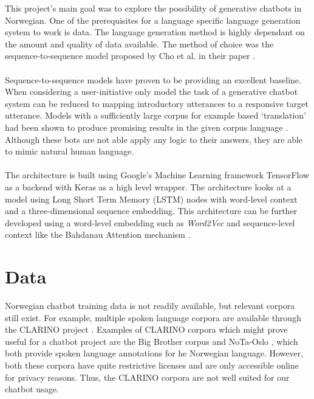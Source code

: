 \documentclass{article}
\begin{document}
This project's main goal was to explore the possibility of generative chatbots
in Norwegian. One of the prerequisites for a language specific language
generation system to work is data. The language generation method is highly
dependant on the amount and quality of data available. The method of choice was
the sequence-to-sequence model proposed by Cho et al. in their paper \cite{Cho2014}.

\paragraph{}
Sequence-to-sequence models have proven to be providing an excellent baseline.
When considering a user-initiative only model the task of a generative chatbot
system can be reduced to mapping introductory utterances to a responsive target
utterance.  Models with a sufficiently large corpus for example based
`translation' had been shown to produce promising results in the given corpus
language \cite{Ezquerra2018}. Although these bots are not able apply any logic
to their answers, they are able to mimic natural human language.

\paragraph{}
The architecture is built using Google's Machine Learning framework TensorFlow
as a backend with Keras as a high level wrapper. The architecture looks at a
model using Long Short Term Memory (LSTM) nodes with word-level context and a
three-dimensional sequence embedding. This architecture can be further
developed using a word-level embedding such as \textit{Word2Vec}
\cite{word2vec} and sequence-level context like the Bahdanau Attention mechanism
\cite{Bahdanau2015}.

\section*{Data}
Norwegian chatbot training data is not readily available, but relevant corpora
still exist.  For example, multiple spoken language corpora are available
through the CLARINO project \cite{clarino-about}. Examples of CLARINO
corpora which might prove useful for a chatbot project are the Big Brother
corpus \cite{clarino-bb} and NoTa-Oslo \cite{clarino-nota}, which both provide
spoken language annotations for he Norwegian language. However, both these
corpora have quite restrictive licenses and are only accessible online for
privacy reasons. Thus, the CLARINO corpora are not well suited for our chatbot
usage.
\end{document}
